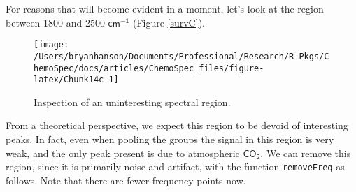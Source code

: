 \documentclass[letter,10pt,twocolumn,twoside,printwatermark=false]{pinp}
\begin{document}
For reasons that will become evident in a moment, let's look at the
region between 1800 and 2500 \(\mathsf{cm^{-1}}\) (Figure \ref{survC}).

\begin{Shaded}
\begin{Highlighting}[]
   \NormalTok{,}
   \NormalTok{,}
   \NormalTok{,}
   \NormalTok{(}\NormalTok{, }\NormalTok{),}
   \NormalTok{(}\NormalTok{, }\NormalTok{))}
\end{Highlighting}
\end{Shaded}

\begin{figure}

{\centering \texttt{[image: /Users/bryanhanson/Documents/Professional/Research/R\_Pkgs/ChemoSpec/docs/articles/ChemoSpec\_files/figure-latex/Chunk14c-1]} 

}

\caption{\label{survC}Inspection of an uninteresting spectral region.}\label{fig:Chunk14c}
\end{figure}

From a theoretical perspective, we expect this region to be devoid of
interesting peaks. In fact, even when pooling the groups the signal in
this region is very weak, and the only peak present is due to
atmospheric \(\mathsf{CO_2}\). We can remove this region, since it is
primarily noise and artifact, with the function \texttt{removeFreq} as
follows. Note that there are fewer frequency points now.

\begin{Shaded}
\begin{Highlighting}[]
\StringTok{ }
  \OperatorTok{$}\OperatorTok{>}\StringTok{ } \OperatorTok{&}
\StringTok{  }\OperatorTok{$}\OperatorTok{<}\StringTok{ }\NormalTok{)}
\end{Highlighting}
\end{Shaded}
\end{document}
